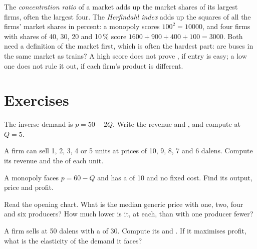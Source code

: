 \begin{measure}
The \emph{concentration ratio} of a market adds up the market shares of its largest firms, often the largest four. The \emph{Herfindahl index} adds up the squares of
all the firms' market shares in percent: a monopoly scores $100^2 = 10000$, and four firms with shares of 40, 30, 20 and 10\,\% score $1600 + 900 + 400 + 100 = 3000$.
Both need a definition of the market first, which is often the hardest part: are buses in the same market as trains? A high score does not prove , if
entry is easy; a low one does not rule it out, if each firm's product is different.
\end{measure}

\section{Exercises}

\begin{exercise}[$\star$]\label{exo:g11:monopoly:1}
The inverse demand is $p = 50 - 2Q$. Write the revenue and , and compute  at $Q = 5$.
\end{exercise}

\begin{exercise}[$\star$]\label{exo:g11:monopoly:2}
A firm can sell 1, 2, 3, 4 or 5 units at prices of 10, 9, 8, 7 and 6 dalens. Compute its revenue and the  of each unit.
\end{exercise}

\begin{exercise}[$\star$]\label{exo:g11:monopoly:3}
A monopoly faces $p = 60 - Q$ and has a  of 10 and no fixed cost. Find its output, price and profit.
\end{exercise}

\begin{exercise}[$\star$]\label{exo:g11:monopoly:4}
Read the opening chart. What is the median generic price with one, two, four and six producers? How much lower is it, at each, than with one producer fewer?
\end{exercise}

\begin{exercise}[$\star$]\label{exo:g11:monopoly:5}
A firm sells at 50 dalens with a  of 30. Compute its  and . If it maximises profit, what is the elasticity of the demand it faces?
\end{exercise}

